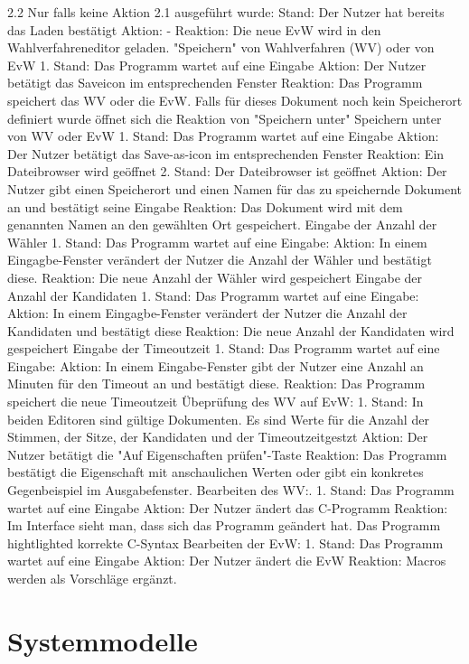 \documentclass[a4paper]{scrreprt}
\begin{document}
2.2
Nur falls keine Aktion 2.1 ausgeführt wurde:
Stand: Der Nutzer hat bereits das Laden bestätigt
Aktion: -
Reaktion: Die neue EvW wird in den Wahlverfahreneditor geladen.
"Speichern" von Wahlverfahren (WV) oder von EvW
1. Stand: Das Programm wartet auf eine Eingabe
Aktion: Der Nutzer betätigt das Saveicon im entsprechenden Fenster
Reaktion: Das Programm speichert das WV oder die EvW. Falls für dieses Dokument noch kein
Speicherort definiert wurde öffnet sich die Reaktion von "Speichern unter"
Speichern unter von WV oder EvW
1. Stand: Das Programm wartet auf eine Eingabe
Aktion: Der Nutzer betätigt das Save-as-icon im entsprechenden Fenster
Reaktion: Ein Dateibrowser wird geöffnet
2. Stand: Der Dateibrowser ist geöffnet
Aktion: Der Nutzer gibt einen Speicherort und einen Namen für das zu speichernde Dokument an
und bestätigt seine Eingabe
Reaktion: Das Dokument wird mit dem genannten Namen an den gewählten Ort gespeichert.
Eingabe der Anzahl der Wähler
1. Stand: Das Programm wartet auf eine Eingabe:
Aktion: In einem Eingagbe-Fenster verändert der Nutzer die Anzahl der Wähler und bestätigt
diese.
Reaktion: Die neue Anzahl der Wähler wird gespeichert
Eingabe der Anzahl der Kandidaten
1. Stand: Das Programm wartet auf eine Eingabe:
Aktion: In einem Eingagbe-Fenster verändert der Nutzer die Anzahl der Kandidaten und bestätigt
diese
Reaktion: Die neue Anzahl der Kandidaten wird gespeichert
Eingabe der Timeoutzeit
1. Stand: Das Programm wartet auf eine Eingabe:
Aktion: In einem Eingabe-Fenster gibt der Nutzer eine Anzahl an Minuten für den Timeout an
und bestätigt diese.
Reaktion: Das Programm speichert die neue Timeoutzeit
Übeprüfung des WV auf EvW:
1. Stand: In beiden Editoren sind gültige Dokumenten. Es sind Werte für die Anzahl der Stimmen,
der Sitze, der Kandidaten und der Timeoutzeitgestzt
Aktion: Der Nutzer betätigt die "Auf Eigenschaften prüfen"-Taste
Reaktion: Das Programm bestätigt die Eigenschaft mit anschaulichen Werten oder gibt ein
konkretes Gegenbeispiel im Ausgabefenster.
Bearbeiten des WV:.
1. Stand: Das Programm wartet auf eine Eingabe
Aktion: Der Nutzer ändert das C-Programm
Reaktion: Im Interface sieht man, dass sich das Programm geändert hat. Das Programm
hightlighted korrekte C-Syntax
Bearbeiten der EvW:
1. Stand: Das Programm wartet auf eine Eingabe
Aktion: Der Nutzer ändert die EvW
Reaktion: Macros werden als Vorschläge ergänzt.

\chapter{Systemmodelle}
\end{document}
